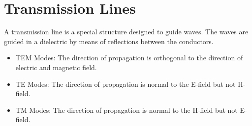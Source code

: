 \section{Transmission Lines}
A transmission line is a special structure designed to guide waves. The waves are guided in a dielectric by means of reflections between the conductors.

\begin{itemize}
	\item TEM Modes: The direction of propagation is orthogonal to the direction of electric and magnetic field.
	\item TE Modes: The direction of propagation is normal to the E-field but not H-field.
	\item TM Modes: The direction of propagation is normal to the H-field but not E-field.
\end{itemize}


